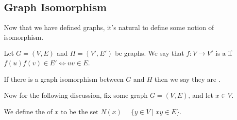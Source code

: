 \documentclass[a4paper]{scrreprt}
\begin{document}
\subsection{Graph Isomorphism}

Now that we have defined graphs, it's natural to define some notion of isomorphism.

\begin{definition}
	Let $G = (V, E)$ and $H = (V', E')$ be graphs. We say that $f : V \rightarrow V'$ is a  if $f(u)f(v) \in E' \iff uv \in E$. 

	If there is a graph isomorphism between $G$ and $H$ then we say they are .
\end{definition}

Now for the following discussion, fix some graph $G = (V, E)$, and let $x \in V$. 

\begin{definition}[Neighbourhood]
	We define the  of $x$ to be the set $N(x) = \{ y \in V \mid xy \in E\}$.
\end{definition}
\end{document}
